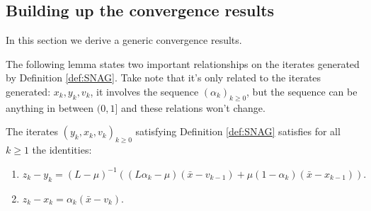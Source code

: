 \documentclass[12pt]{article}
\begin{document}
    \subsection{Building up the convergence results}
        In this section we derive a generic convergence results. 
        \par
        The following lemma states two important relationships on the iterates generated by Definition \ref{def:SNAG}. 
        Take note that it's only related to the iterates generated: $x_k, y_k, v_k$, it involves the sequence $(\alpha_k)_{k \ge 0}$, but the sequence can be anything in between $(0, 1]$ and these relations won't change. 
        \begin{lemma}\label{lemma:snag-identities}
            The iterates $(y_k, x_k, v_k)_{k \ge0}$ satisfying Definition \ref{def:SNAG} satisfies for all $k \ge 1$ the identities: 
            \begin{enumerate}[nosep]
                \item $z_k - y_k = (L - \mu)^{-1}((L\alpha_k - \mu)(\bar x - v_{k - 1}) + \mu(1 - \alpha_k)(\bar x - x_{k - 1})).$
                \item $z_k - x_k = \alpha_k (\bar x - v_k).$
            \end{enumerate}
        \end{lemma}
\end{document}
